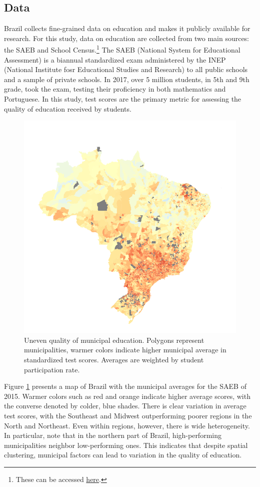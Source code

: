 \documentclass[12pt,a4paper]{article}
\begin{document}
\subsection{Data}

Brazil collects fine-grained data on education and makes it publicly available for research. For this study, data on education are collected from two main sources: the SAEB and School Census.\footnote{These can be accessed \hyperlink{http://portal.inep.gov.br/web/guest/dados}{here}.} The SAEB (National System for Educational Assessment) is a biannual standardized exam administered by the INEP (National Institute fosr Educational Studies and Research) to all public schools and a sample of private schools. In 2017, over 5 million students, in 5th and 9th grade, took the exam, testing their proficiency in both mathematics and Portuguese. In this study, test scores are the primary metric for assessing the quality of education received by students.

\begin{figure}[h]
    \centering
    \includegraphics[width=0.6\linewidth]{plots/saeb_map.pdf}
    \caption{Uneven quality of municipal education. Polygons represent municipalities, warmer colors indicate higher municipal average in standardized test scores. Averages are weighted by student participation rate.}
    \label{fig:saeb_map}
\end{figure}

Figure \ref{fig:saeb_map} presents a map of Brazil with the municipal averages for the SAEB of 2015. Warmer colors such as red and orange indicate higher average scores, with the converse denoted by colder, blue shades. There is clear variation in average test scores, with the Southeast and Midwest outperforming poorer regions in the North and Northeast. Even within regions, however, there is wide heterogeneity. In particular, note that in the northern part of Brazil, high-performing municipalities neighbor low-performing ones. This indicates that despite spatial clustering, municipal factors can lead to variation in the quality of education.
\end{document}
